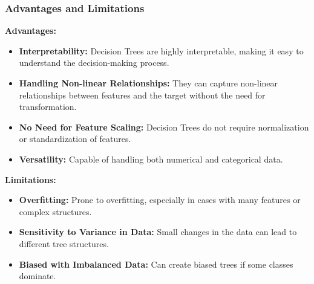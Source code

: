 \documentclass[letterpaper,10pt]{article}
\begin{document}
\subsubsection{Advantages and Limitations}
\textbf{Advantages:}
\begin{itemize}
    \item \textbf{Interpretability:} Decision Trees are highly interpretable, making it easy to understand the decision-making process.
    \item \textbf{Handling Non-linear Relationships:} They can capture non-linear relationships between features and the target without the need for transformation.
    \item \textbf{No Need for Feature Scaling:} Decision Trees do not require normalization or standardization of features.
    \item \textbf{Versatility:} Capable of handling both numerical and categorical data.
\end{itemize}

\textbf{Limitations:}
\begin{itemize}
    \item \textbf{Overfitting:} Prone to overfitting, especially in cases with many features or complex structures.
    \item \textbf{Sensitivity to Variance in Data:} Small changes in the data can lead to different tree structures.
    \item \textbf{Biased with Imbalanced Data:} Can create biased trees if some classes dominate.
\end{itemize}
\end{document}
